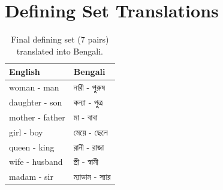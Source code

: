 \documentclass[11pt]{article}
\newcommand{\bn}[1]{{\bengalifont #1}}
\begin{document}
\section{Defining Set Translations}
\label{sec:appendix-b}

\begin{table}[h]
\centering
\small
\begin{tabular}{ll}
\hline
\textbf{English} & \textbf{Bengali} \\
\hline
woman - man & \bn{নারী - পুরুষ} \\
daughter - son & \bn{কন্যা - পুত্র} \\
mother - father & \bn{মা - বাবা} \\
girl - boy & \bn{মেয়ে - ছেলে} \\
queen - king & \bn{রানী - রাজা} \\
wife - husband & \bn{স্ত্রী - স্বামী} \\
madam - sir & \bn{ম্যাডাম - স্যার} \\
\hline
\end{tabular}
\caption{Final defining set (7 pairs) translated into Bengali.}
\label{tab:defining-set}
\end{table}
\end{document}
